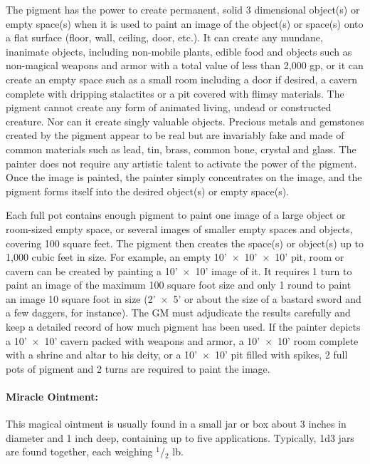 \begin{multicols}{2}
The pigment has the power to create permanent, solid 3 dimensional object(s) or empty space(s) when it is used to paint an image of the object(s) or space(s) onto a flat surface (floor, wall, ceiling, door, etc.).  It can create any mundane, inanimate objects, including non-mobile plants, edible food and objects such as non-magical weapons and armor with a total value of less than 2,000 gp, or it can create an empty space such as a small room including a door if desired, a cavern complete with dripping stalactites or a pit covered with flimsy materials.  The pigment cannot create any form of animated living, undead or constructed creature.  Nor can it create singly valuable objects.  Precious metals and gemstones created by the pigment appear to be real but are invariably fake and made of common materials such as lead, tin, brass, common bone, crystal and glass.  The painter does not require any artistic talent to activate the power of the pigment.  Once the image is painted, the painter simply concentrates on the image, and the pigment forms itself into the desired object(s) or empty space(s).

Each full pot contains enough pigment to paint one image of a large object or room-sized empty space, or several images of smaller empty spaces and objects, covering 100 square feet.  The pigment then creates the space(s) or object(s) up to 1,000 cubic feet in size.  For example, an empty 10'~$\times$~10'~$\times$~10' pit, room or cavern can be created by painting a 10'~$\times$~10' image of it.  It requires 1 turn to paint an image of the maximum 100 square foot size and only 1 round to paint an image 10 square foot in size (2'~$\times$~5' or about the size of a bastard sword and a few daggers, for instance).  The GM must adjudicate the results carefully and keep a detailed record of how much pigment has been used.  If the painter depicts a 10'~$\times$~10' cavern packed with weapons and armor, a 10'~$\times$~10' room complete with a shrine and altar to his deity, or a 10'~$\times$~10' pit filled with spikes, 2 full pots of pigment and 2 turns are required to paint the image. 

\paragraph{Miracle Ointment:} This magical ointment is usually found in a small jar or box about 3 inches in diameter and 1 inch deep, containing up to five applications.  Typically, 1d3 jars are found together, each weighing $^1$/$_2$ lb.  


\end{multicols}
